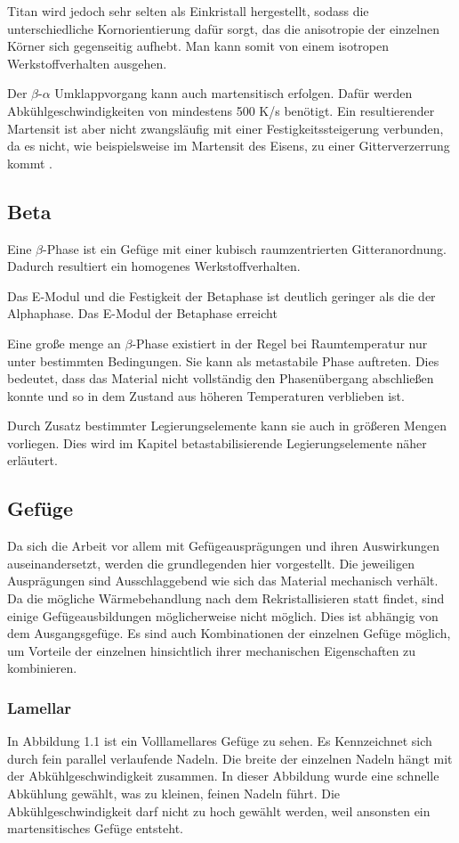 \documentclass[a4paper, singlepage, 11pt]{tubsreprt}
\begin{document}
Titan wird jedoch sehr selten als Einkristall hergestellt, sodass die unterschiedliche Kornorientierung dafür sorgt, das die anisotropie der einzelnen Körner sich gegenseitig aufhebt. Man kann somit von einem isotropen Werkstoffverhalten ausgehen.

Der $\beta$-$\alpha$ Umklappvorgang kann auch martensitisch erfolgen. Dafür werden Abkühlgeschwindigkeiten von mindestens 500 K/s benötigt. Ein resultierender Martensit ist aber nicht zwangsläufig mit einer Festigkeitssteigerung verbunden, da es nicht, wie beispielsweise im Martensit des Eisens, zu einer Gitterverzerrung kommt \cite[vgl. ]{Siemers2017}.
\subsection{Beta}
Eine $\beta$-Phase ist ein Gefüge mit einer kubisch raumzentrierten Gitteranordnung. Dadurch resultiert ein homogenes Werkstoffverhalten.

Das E-Modul und die Festigkeit der Betaphase ist deutlich geringer als die der Alphaphase. Das E-Modul der Betaphase erreicht

Eine große menge an $\beta$-Phase existiert in der Regel bei Raumtemperatur nur unter bestimmten Bedingungen. Sie kann als metastabile Phase auftreten. Dies bedeutet, dass das Material nicht vollständig den Phasenübergang abschließen konnte und so in dem Zustand aus höheren Temperaturen verblieben ist. 

Durch Zusatz bestimmter Legierungselemente kann sie auch in größeren Mengen vorliegen. Dies wird im Kapitel betastabilisierende Legierungselemente näher erläutert.
\subsection{Gefüge}
Da sich die Arbeit vor allem mit Gefügeausprägungen und ihren Auswirkungen auseinandersetzt, werden die grundlegenden hier vorgestellt. Die jeweiligen Ausprägungen sind Ausschlaggebend wie sich das Material mechanisch verhält. Da die mögliche Wärmebehandlung nach dem Rekristallisieren statt findet, sind einige Gefügeausbildungen möglicherweise nicht möglich. Dies ist abhängig von dem Ausgangsgefüge.
Es sind auch Kombinationen der einzelnen Gefüge möglich, um Vorteile der einzelnen hinsichtlich ihrer mechanischen Eigenschaften zu kombinieren.
\subsubsection{Lamellar}
In Abbildung 1.1 ist ein Volllamellares Gefüge zu sehen. Es Kennzeichnet sich durch fein parallel verlaufende Nadeln. Die breite der einzelnen Nadeln hängt mit der Abkühlgeschwindigkeit zusammen. In dieser Abbildung wurde eine schnelle Abkühlung gewählt, was zu kleinen, feinen Nadeln führt. Die Abkühlgeschwindigkeit darf nicht zu hoch gewählt werden, weil ansonsten ein martensitisches Gefüge entsteht. 
\end{document}
